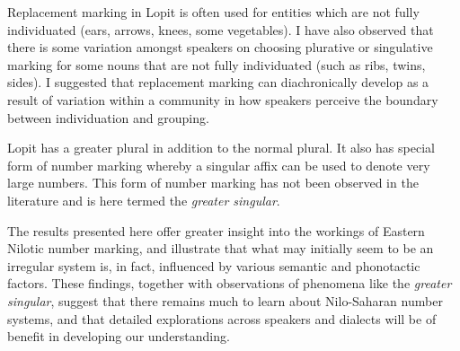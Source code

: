 \documentclass[output=paper]{langsci/langscibook}
\begin{document}
Replacement marking in Lopit is often used for entities which are not fully individuated (ears, arrows, knees, some vegetables). I have also observed that there is some variation amongst speakers on choosing plurative or singulative marking for some nouns that are not fully individuated (such as ribs, twins, sides). I suggested that replacement marking can diachronically develop as a result of variation within a community in how speakers perceive the boundary between individuation and grouping.

Lopit has a greater plural in addition to the normal plural. It also has special form of number marking whereby a singular affix can be used to denote very large numbers. This form of number marking has not been observed in the literature and is here termed the \textit{greater singular}.

The results presented here offer greater insight into the workings of Eastern Nilotic number marking, and illustrate that what may initially seem to be an irregular system is, in fact, influenced by various semantic and phonotactic factors. These findings, together with observations of phenomena like the \textit{greater singular}, suggest that there remains much to learn about Nilo-Saharan number systems, and that detailed explorations across speakers and dialects will be of benefit in developing our understanding. 
\end{document}
